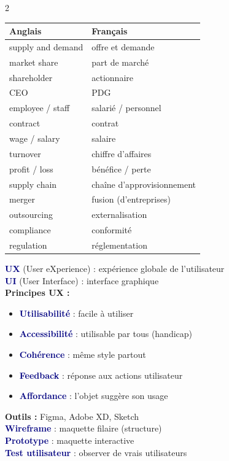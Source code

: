 \documentclass[a4paper,10pt]{article}
\newcommand{\key}[1]{\textbf{\textcolor{navy}{#1}}}
\begin{document}
\begin{multicols}{2}
\begin{tcolorbox}[basebox, colframe=orange, title=8. ANGLAIS — Vocabulaire CEJM en anglais]
\begin{tabular}{ll}
\toprule
\textbf{Anglais} & \textbf{Français} \\
\midrule
supply and demand & offre et demande \\
market share & part de marché \\
shareholder & actionnaire \\
CEO & PDG \\
employee / staff & salarié / personnel \\
contract & contrat \\
wage / salary & salaire \\
turnover & chiffre d'affaires \\
profit / loss & bénéfice / perte \\
supply chain & chaîne d'approvisionnement \\
merger & fusion (d'entreprises) \\
outsourcing & externalisation \\
compliance & conformité \\
regulation & réglementation \\
\bottomrule
\end{tabular}
\end{tcolorbox}

\begin{tcolorbox}[basebox, colframe=green, title=9. Activités Transversales — UX/UI]
\key{UX} (User eXperience) : expérience globale de l'utilisateur \\
\key{UI} (User Interface) : interface graphique \\[4pt]
\textbf{Principes UX :}
\begin{itemize}
  \item \key{Utilisabilité} : facile à utiliser
  \item \key{Accessibilité} : utilisable par tous (handicap)
  \item \key{Cohérence} : même style partout
  \item \key{Feedback} : réponse aux actions utilisateur
  \item \key{Affordance} : l'objet suggère son usage
\end{itemize}
\vspace{4pt}
\textbf{Outils :} Figma, Adobe XD, Sketch \\
\key{Wireframe} : maquette filaire (structure) \\
\key{Prototype} : maquette interactive \\
\key{Test utilisateur} : observer de vrais utilisateurs
\end{tcolorbox}


\end{multicols}
\end{document}
